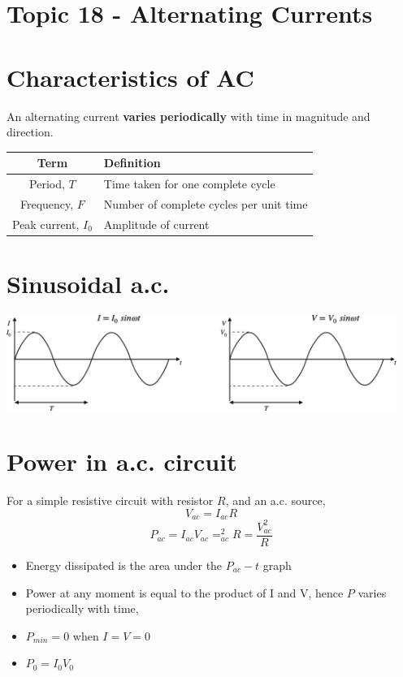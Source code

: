 \documentclass[a4paper, 10pt]{article}
\begin{document}
\section*{Topic 18 - Alternating Currents}
\section{Characteristics of AC}

An alternating current \textbf{varies periodically} with time in magnitude and direction.

\begin{center}
   \begin{tabular}{c | T}
      Term & Definition \\
      \hline
      Period, $T$ & Time taken for one complete cycle \\ 
      \hline
      Frequency, $F$  & Number of complete cycles per unit time \\
      \hline
      Peak current, $I_0$ & Amplitude of current \\
      \hline
   \end{tabular}
\end{center}

\section{Sinusoidal a.c.}
\begin{center}
  \includegraphics[width=5in]{figures/1.pdf}  
\end{center}	

\section{Power in a.c. circuit}
For a simple resistive circuit with resistor $R$, and an a.c. source,
\[
   V_{ac} = I_{ac} R
\]
\[
   P_{ac} = I_{ac} V_{ac} = _{ac}^2 R = \frac{V_{ac}^2}{R}
\]
\begin{itemize}
   \item Energy dissipated is the area under the $P_{ac} - t$ graph
   \item Power at any moment is equal to the product of I and V, hence $P$ varies periodically with time,
   \item $P_{min} = 0$ when $I = V =  0$ 
   \item $P_0 = I_0 V_0$ 
\end{itemize}	
\end{document}
